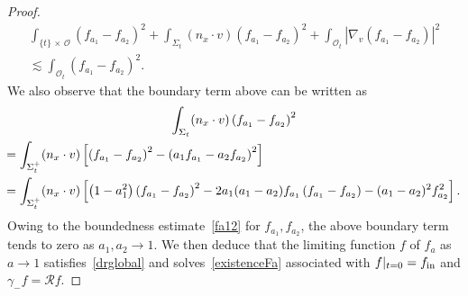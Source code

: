 \documentclass[10pt]{amsart}
\theoremstyle{definition}\newtheorem{defi}[theo]{Definition}\newtheorem{rema}[theo]{Remark}\newtheorem{exam}[theo]{Example}\newtheorem{exem}[theo]{Example}\newtheorem{nota}[theo]{Notation}
\newcommand*\fin {f_{\rm in}}
\newcommand*\RR {\mathcal{R}}
\newcommand*\OO {\mathcal{O}}
\begin{document}
\begin{proof}
\begin{multline*}
\int_{\{t\}\,\times\,\OO} \left(f_{a_1}-f_{a_2}\right)^2 + \int_{\Sigma_t}\left(n_x\cdot v\right) \left(f_{a_1}-f_{a_2}\right)^2 +\int_{\OO_t}\left|\nabla_v\left(f_{a_1}-f_{a_2}\right)\right|^2\\
\lesssim \int_{\OO_t}\left(f_{a_1}-f_{a_2}\right)^2.
\end{multline*}
We also observe that the boundary term above can be written as
\begin{multline*}
\int_{\Sigma_t}(n_x\cdot v) \left(f_{a_1}-f_{a_2}\right)^2
\\
\mkern-10mu\begin{aligned}
&= \int_{\Sigma_t^+}(n_x\cdot v) \left[\left(f_{a_1}-f_{a_2}\right)^2-\left(a_1f_{a_1}-a_2f_{a_2}\right)^2\right]\\
&= \int_{\Sigma_t^+}(n_x\cdot v) \left[\left(1-a_1^2\right)\left(f_{a_1}-f_{a_2}\right)^2-2a_1(a_1-a_2)f_{a_1}\left(f_{a_1}-f_{a_2}\right)-(a_1-a_2)^2f_{a_2}^2\right].
\end{aligned}
\end{multline*}
Owing to the boundedness estimate~\eqref{fa12} for $f_{a_1},f_{a_2}$, the above boundary term tends to zero as $a_1,a_2\rightarrow1$. We then deduce that the limiting function $f$ of $f_a$ as $a\rightarrow1$ satisfies~\eqref{drglobal} and solves~\eqref{existenceFa} associated with $f|_{t=0}=\fin$ and $\gamma_-f=\RR f$.


\end{proof}
\end{document}
